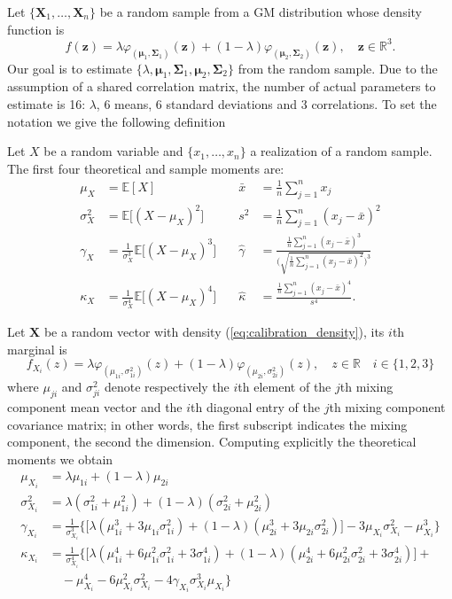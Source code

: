 Let $\{\bm{X}_1,\ldots,\bm{X}_n \}$ be a random sample from a GM distribution whose density function is 
\begin{equation}\label{eq:calibration_density}
f(\bm{z}) = \lambda \varphi_{(\bm{\mu}_1,\bm{\Sigma}_1)}(\bm{z}) + (1-\lambda)\varphi_{(\bm{\mu}_2,\bm{\Sigma}_2)}(\bm{z}),\quad \bm{z} \in \mathbb{R}^3.
\end{equation}
Our goal is to estimate $\{\lambda,\bm{\mu}_1,\bm{\Sigma}_1,\bm{\mu}_2,\bm{\Sigma}_2 \}$ from the random sample. Due to the assumption of a shared correlation matrix, the number of actual parameters to estimate is 16: $\lambda$, 6 means, 6 standard deviations and 3 correlations.
To set the notation we give the following definition
\begin{definition}
	Let $X$ be a random variable and $\{x_1,\ldots,x_n\} $ a realization of a random sample. The first four theoretical and sample moments are:
	\begin{align*}
	\mu_X & = \mathbb{E}[X] \quad & \bar{x} &= \frac{1}{n}\sum_{j=1}^{n}x_j\\[2ex]
	\sigma^2_X & = \mathbb{E}\big[(X-\mu_X)^2\big] \quad & s^2 &= \frac{1}{n}\sum_{j=1}^{n}(x_j-\bar{x})^2\\[2ex]
	\gamma_X & = \frac{1}{\sigma_X^3}\mathbb{E}\big[(X-\mu_X)^3\big] \quad & \widehat{\gamma} & = \frac{\frac{1}{n}\sum_{j=1}^{n}(x_j-\bar{x})^3}{\Big(\sqrt{\frac{1}{n}\sum_{j=1}^{n}(x_j-\bar{x})^2} \Big)^3}\\[2ex]
	\kappa_X & = \frac{1}{\sigma_X^4}\mathbb{E}\big[ (X-\mu_X)^4\big] \quad & \widehat{\kappa}&= \frac{\frac{1}{n}\sum_{j=1}^{n}(x_j-\bar{x})^4}{s^4}.
	\end{align*}
\end{definition}
Let $\bm{X}$ be a random vector with density (\ref{eq:calibration_density}), its $i$th marginal is \[f_{X_i}(z) = \lambda\varphi_{(\mu_{1i},\sigma^2_{1i})}(z)+(1-\lambda)\varphi_{(\mu_{2i},\sigma^2_{2i})}(z), \quad z \in \mathbb{R} \quad  i \in \{1,2,3\} \]
where $\mu_{ji}$ and $\sigma^2_{ji}$ denote respectively the $i$th element of the $j$th mixing component mean vector  and the $i$th diagonal entry of the $j$th mixing component covariance matrix; in other words, the first subscript indicates the mixing component, the second the dimension. Computing explicitly the theoretical moments we obtain
\begin{align*}
\mu_{X_i} & = \lambda\mu_{1i}+(1-\lambda)\mu_{2i}\\[15pt] 
\sigma^2_{X_i} & = \lambda(\sigma^2_{1i}+\mu^2_{1i})+(1-\lambda)(\sigma^2_{2i}+\mu^2_{2i})\\[15pt]
\gamma_{X_i} & = \frac{1}{\sigma^3_{X_i}}\Big\{\big[\lambda(\mu^3_{1i}+3\mu_{1i}\sigma^2_{1i}) + (1-\lambda)(\mu^3_{2i}+3\mu_{2i}\sigma^2_{2i})\big] -3\mu_{X_i}\sigma^2_{X_i}-\mu^3_{X_i} \Big\}\\[15pt]
\kappa_{X_i}&= \frac{1}{\sigma^4_{X_i}}\Big\{\big[\lambda(\mu^4_{1i}+6\mu^2_{1i}\sigma^2_{1i}+3\sigma^4_{1i})+(1-\lambda)(\mu^4_{2i}+6\mu^2_{2i}\sigma^2_{2i}+3\sigma^4_{2i}) \big] +\\
& \quad -\mu^4_{X_i} -6\mu^2_{X_i}\sigma^2_{X_i}-4\gamma_{X_i}\sigma^3_{X_i}\mu_{X_i} \Big\}
\end{align*}
